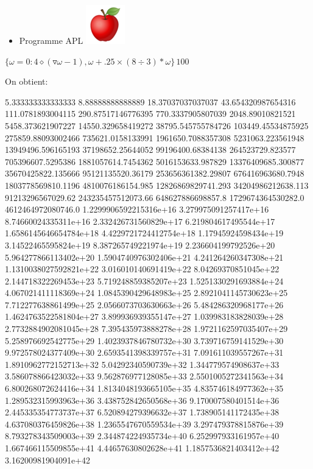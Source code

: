\documentclass[]{scrartcl}
\providecommand{\tightlist}{%
  \setlength{\itemsep}{0pt}\setlength{\parskip}{0pt}}
\begin{document}
\begin{itemize}
\tightlist
\item
  Programme APL
  \vspace{-1mm}\includegraphics[scale=0.25]{images/apple.png}
\end{itemize}

\(\{\omega=0: 4 \diamond (\triangledown\omega - 1), \omega + .25\times(8\div 3)*\omega\}\, 100\)

On obtient:

\tiny{}

5.333333333333333 8.88888888888889 18.37037037037037 43.654320987654316
111.0781893004115 290.87517146776395 770.3337905807039 2048.89010821521
5458.373621907227 14550.329658419272 38795.545755784726
103449.45534875925 275859.88093002466 735621.0158133991
1961650.7088357308 5231063.223561948 13949496.596165193
37198652.25644052 99196400.68384138 264523729.823577 705396607.5295386
1881057614.7454362 5016153633.987829 13376409685.300877
35670425822.135666 95121135520.36179 253656361382.29807
676416963680.7948 1803778569810.1196 4810076186154.985
12826869829741.293 34204986212638.113 91213296567029.62
243235457512073.66 648627886698857.8 1729674364530282.0
4612464972080746.0 1.2299906592215316e+16 3.279975091257417e+16
8.74660024335311e+16 2.332426731560829e+17 6.219804617495544e+17
1.6586145646654784e+18 4.4229721724412754e+18 1.17945924598434e+19
3.14522465595824e+19 8.387265749221974e+19 2.236604199792526e+20
5.964277866113402e+20 1.5904740976302406e+21 4.241264260347308e+21
1.1310038027592821e+22 3.016010140691419e+22 8.04269370851045e+22
2.144718322269453e+23 5.719248859385207e+23 1.5251330291693884e+24
4.067021411118369e+24 1.0845390429648983e+25 2.8921041145730623e+25
7.712277638861499e+25 2.0566073703630663e+26 5.484286320968177e+26
1.4624763522581804e+27 3.899936939355147e+27 1.039983183828039e+28
2.7732884902081045e+28 7.395435973888278e+28 1.9721162597035407e+29
5.258976692542775e+29 1.4023937846780732e+30 3.739716759141529e+30
9.972578024377409e+30 2.6593541398339757e+31 7.091611039557267e+31
1.8910962772152713e+32 5.04292340590739e+32 1.344779574908637e+33
3.586078866423032e+33 9.562876977128085e+33 2.5501005272341563e+34
6.800268072624416e+34 1.8134048193665105e+35 4.835746184977362e+35
1.289532315993963e+36 3.438752842650568e+36 9.170007580401514e+36
2.445335354773737e+37 6.520894279396632e+37 1.738905141172435e+38
4.637080376459826e+38 1.2365547670559534e+39 3.297479378815876e+39
8.793278343509003e+39 2.344874224935734e+40 6.252997933161957e+40
1.667466115509855e+41 4.44657630802628e+41 1.1857536821403412e+42
3.16200981904091e+42 \normalsize
\end{document}
